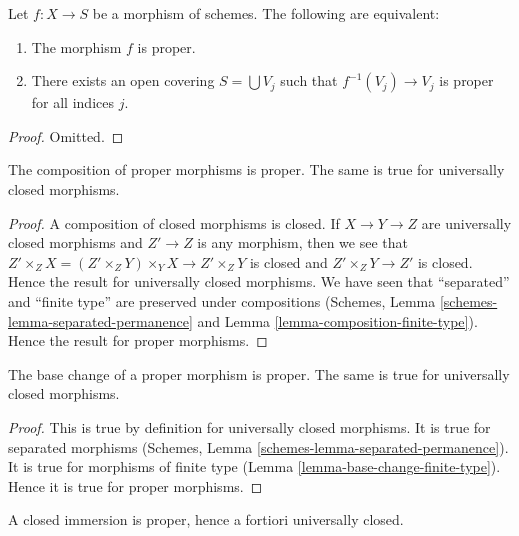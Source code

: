 \begin{lemma}
\label{lemma-proper-local-on-the-base}
Let $f : X \to S$ be a morphism of schemes.
The following are equivalent:
\begin{enumerate}
\item The morphism $f$ is proper.
\item There exists an open covering $S = \bigcup V_j$ such
that $f^{-1}(V_j) \to V_j$ is proper for all indices $j$.
\end{enumerate}
\end{lemma}

\begin{proof}
Omitted.
\end{proof}

\begin{lemma}
\label{lemma-composition-proper}
The composition of proper morphisms is proper.
The same is true for universally closed morphisms.
\end{lemma}

\begin{proof}
A composition of closed morphisms is closed.
If $X \to Y \to Z$ are universally closed morphisms
and $Z' \to Z$ is any morphism, then we see that
$Z' \times_Z X = (Z' \times_Z Y) \times_Y X  \to Z' \times_Z Y$
is closed and $Z' \times_Z Y \to Z'$ is closed.
Hence the result for universally closed morphisms.
We have seen that ``separated'' and ``finite type''
are preserved under compositions
(Schemes, Lemma \ref{schemes-lemma-separated-permanence} and
Lemma \ref{lemma-composition-finite-type}). Hence the
result for proper morphisms.
\end{proof}

\begin{lemma}
\label{lemma-base-change-proper}
The base change of a proper morphism is proper.
The same is true for universally closed morphisms.
\end{lemma}

\begin{proof}
This is true by definition for universally closed morphisms.
It is true for separated morphisms
(Schemes, Lemma \ref{schemes-lemma-separated-permanence}).
It is true for morphisms of finite type
(Lemma \ref{lemma-base-change-finite-type}).
Hence it is true for proper morphisms.
\end{proof}

\begin{lemma}
\label{lemma-closed-immersion-proper}
A closed immersion is proper, hence a fortiori universally closed.
\end{lemma}

